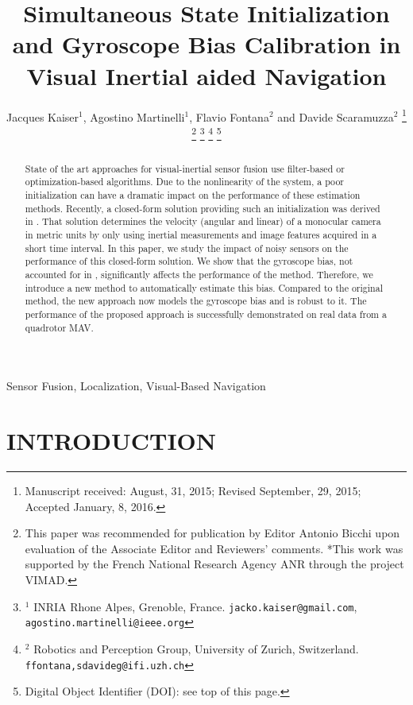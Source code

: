 \documentclass[letterpaper, 10 pt, journal, twoside]{IEEEtran}  %
\title{Simultaneous State Initialization and Gyroscope Bias Calibration in Visual Inertial aided Navigation} %
\author{Jacques Kaiser$^{1}$, Agostino Martinelli$^{1}$, Flavio Fontana$^{2}$ and Davide Scaramuzza$^{2}$%
\thanks{Manuscript received: August, 31, 2015; Revised September, 29, 2015; Accepted January, 8, 2016.}%
\thanks{This paper was recommended for publication by Editor Antonio Bicchi upon evaluation of the Associate Editor and Reviewers' comments. *This work was supported by the French National Research Agency ANR through the project VIMAD.}%
\thanks{$^{1}$ INRIA Rhone Alpes, Grenoble, France. {\tt\small jacko.kaiser@gmail.com}, {\tt\small agostino.martinelli@ieee.org}}%
\thanks{$^{2}$ Robotics and Perception Group, University of Zurich, Switzerland. {\tt\small ffontana,sdavideg@ifi.uzh.ch}}%
\thanks{Digital Object Identifier (DOI): see top of this page.}
}
\begin{document}
\maketitle




\begin{abstract}
State of the art approaches for visual-inertial sensor fusion use filter-based or optimization-based algorithms. Due to the nonlinearity of the system, a poor initialization can have a dramatic impact on the performance of these estimation methods.
Recently, a closed-form solution providing such an initialization was derived in \cite{Martinelli2014}.
That solution determines the velocity (angular and linear) of a monocular camera in metric units by only using inertial measurements and image features acquired in a short time interval.
In this paper, we study the impact of noisy sensors on the performance of this closed-form solution. We show that the gyroscope bias, not accounted for in \cite{Martinelli2014}, significantly affects the performance of the method.
Therefore, we introduce a new method to automatically estimate this bias.
Compared to the original method, the new approach now models the gyroscope bias and is robust to it.
The performance of the proposed approach is successfully demonstrated on real data from a quadrotor MAV.
\end{abstract}

\begin{IEEEkeywords}
  Sensor Fusion, Localization, Visual-Based Navigation
\end{IEEEkeywords}


\section{INTRODUCTION}
\end{document}
